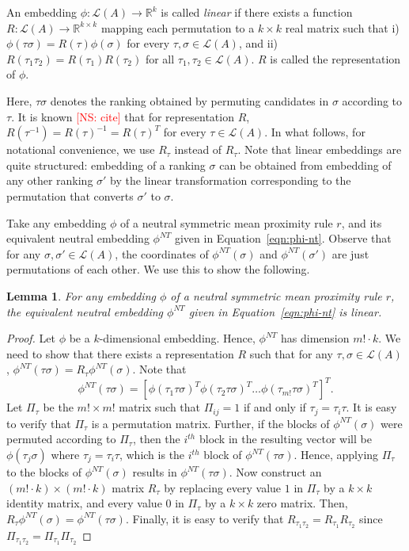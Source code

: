 \documentclass[10pt,letterpaper]{article}
\newcommand{\calL}{{\mathcal{L}}}
\newcommand{\rank}{{\calL(A)}}
\newtheorem{lemma}{Lemma}
\newenvironment{definition}[1][Definition]{\begin{trivlist}
\item[\hskip \labelsep {\bfseries #1}]}{\end{trivlist}}
\newcommand{\kibitz}[2]{\ifnum\Comments=1\textcolor{#1}{#2}\fi}
\newcommand{\cns}[1]{\kibitz{red} {[NS: #1]}}
\newcommand{\nt}{NT}
\begin{document}
\begin{definition}[Linear Embeddings]
An embedding $\phi:\rank \rightarrow \mathbb{R}^k$ is called \emph{linear} if there exists a function $R : \rank \rightarrow \mathbb{R}^{k \times k}$ mapping each permutation to a $k \times k$ real matrix such that i) $\phi(\tau \sigma) = R(\tau) \phi(\sigma)$ for every $\tau,\sigma \in \rank$, and ii) $R(\tau_1 \tau_2) = R(\tau_1) R(\tau_2)$ for all $\tau_1,\tau_2 \in \rank$. $R$ is called the representation of $\phi$. 
\end{definition}
Here, $\tau \sigma$ denotes the ranking obtained by permuting candidates in $\sigma$ according to $\tau$. It is known \cns{cite} that for representation $R$, $R(\tau^{-1}) = R(\tau)^{-1} = R(\tau)^T$ for every $\tau \in \rank$. In what follows, for notational convenience, we use $R_{\tau}$ instead of $R_{\tau}$. Note that linear embeddings are quite structured: embedding of a ranking $\sigma$ can be obtained from embedding of any other ranking $\sigma'$ by the linear transformation corresponding to the permutation that converts $\sigma'$ to $\sigma$. 

Take any embedding $\phi$ of a neutral symmetric mean proximity rule $r$, and its equivalent neutral embedding $\phi^{\nt}$ given in Equation~\eqref{eqn:phi-nt}. Observe that for any $\sigma,\sigma' \in \rank$, the coordinates of $\phi^{\nt}(\sigma)$ and $\phi^{\nt}(\sigma')$ are just permutations of each other. We use this to show the following.
\begin{lemma}
For any embedding $\phi$ of a neutral symmetric mean proximity rule $r$, the equivalent neutral embedding $\phi^{\nt}$ given in Equation~\eqref{eqn:phi-nt} is linear.
\label{lem:nt-linear}
\end{lemma}
\begin{proof}
Let $\phi$ be a $k$-dimensional embedding. Hence, $\phi^{\nt}$ has dimension $m! \cdot k$. We need to show that there exists a representation $R$ such that for any $\tau,\sigma \in \rank$, $\phi^{\nt}(\tau \sigma) = R_{\tau}\phi^{\nt}(\sigma)$. Note that 
$$
\phi^{\nt}(\tau \sigma) = [\phi(\tau_1 \tau \sigma)^T \phi(\tau_2 \tau \sigma)^T \ldots \phi(\tau_{m!} \tau \sigma)^T]^T.
$$
Let $\Pi_{\tau}$ be the $m! \times m!$ matrix such that $\Pi_{ij} = 1$ if and only if $\tau_j = \tau_i \tau$. It is easy to verify that $\Pi_{\tau}$ is a permutation matrix. Further, if the blocks of $\phi^{\nt}(\sigma)$ were permuted according to $\Pi_{\tau}$, then the $i^{th}$ block in the resulting vector will be $\phi(\tau_j \sigma)$ where $\tau_j = \tau_i \tau$, which is the $i^{th}$ block of $\phi^{\nt}(\tau \sigma)$. Hence, applying $\Pi_{\tau}$ to the blocks of $\phi^{\nt}(\sigma)$ results in $\phi^{\nt}(\tau \sigma)$. Now construct an $(m! \cdot k) \times (m! \cdot k)$ matrix $R_{\tau}$ by replacing every value $1$ in $\Pi_{\tau}$ by a $k\times k$ identity matrix, and every value $0$ in $\Pi_{\tau}$ by a $k\times k$ zero matrix. Then, $R_{\tau} \phi^{\nt}(\sigma) = \phi^{\nt}(\tau \sigma)$. Finally, it is easy to verify that $R_{\tau_1 \tau_2} = R_{\tau_1} R_{\tau_2}$ since $\Pi_{\tau_1 \tau_2} = \Pi_{\tau_1} \Pi_{\tau_2}$
\end{proof}
\end{document}
